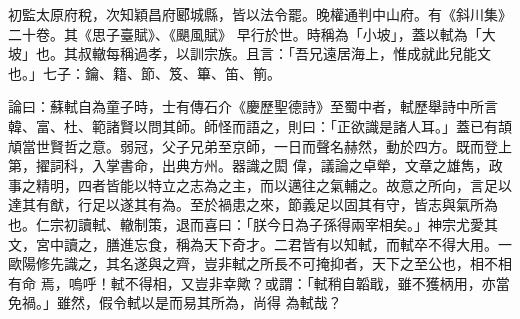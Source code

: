 \begin{pinyinscope}
 初監太原府稅，次知穎昌府郾城縣，皆以法令罷。晚權通判中山府。有《斜川集》二十卷。其《思子臺賦》、《颶風賦》
 早行於世。時稱為「小坡」，蓋以軾為「大坡」也。其叔轍每稱過孝，以訓宗族。且言：「吾兄遠居海上，惟成就此兒能文也。」七子：鑰、籍、節、笈、篳、笛、箾。



 論曰：蘇軾自為童子時，士有傳石介《慶歷聖德詩》至蜀中者，軾歷舉詩中所言韓、富、杜、範諸賢以問其師。師怪而語之，則曰：「正欲識是諸人耳。」蓋已有頡頏當世賢哲之意。弱冠，父子兄弟至京師，一日而聲名赫然，動於四方。既而登上第，擢詞科，入掌書命，出典方州。器識之閎
 偉，議論之卓犖，文章之雄雋，政事之精明，四者皆能以特立之志為之主，而以邁往之氣輔之。故意之所向，言足以達其有猷，行足以遂其有為。至於禍患之來，節義足以固其有守，皆志與氣所為也。仁宗初讀軾、轍制策，退而喜曰：「朕今日為子孫得兩宰相矣。」神宗尤愛其文，宮中讀之，膳進忘食，稱為天下奇才。二君皆有以知軾，而軾卒不得大用。一歐陽修先識之，其名遂與之齊，豈非軾之所長不可掩抑者，天下之至公也，相不相有命
 焉，嗚呼！軾不得相，又豈非幸歟？或謂：「軾稍自韜戢，雖不獲柄用，亦當免禍。」雖然，假令軾以是而易其所為，尚得
 為軾哉？



\end{pinyinscope}